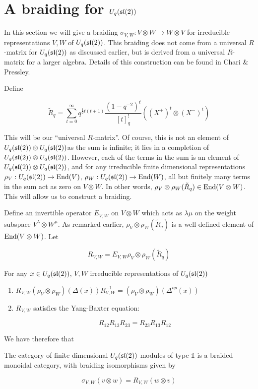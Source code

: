 \section{A braiding for $U_q(\mathfrak{sl}(2))$}


In this section we will give a braiding $\sigma_{V,W}: V \otimes W \to W
\otimes V$ for irreducible representations $V,W$ of $U_q(\mathfrak{sl}(2))$. This
braiding does not come from a universal $R$-matrix for $U_q(\mathfrak{sl}(2))$ as
discussed earlier, but is derived from a universal $R$-matrix for a larger
algebra. Details of this construction can be found in Chari \& Pressley.


Define 

\begin{equation}
\tilde{R}_q = \sum_{t=0}^\infty q^{\frac{1}{2} t(t+1)} \frac{(1-q^{-2})^t}{[t]_q^{!}} ((X^+)^t \otimes (X^-)^t)
\end{equation}

This will be our ``universal $R$-matrix''. Of course, this is not an element of
$U_q(\mathfrak{sl}(2)) \otimes U_q(\mathfrak{sl}(2))$as the sum is infinite; it lies in a
completion of $U_q(\mathfrak{sl}(2)) \otimes U_q(\mathfrak{sl}(2))$. However, each of the terms
in the sum is an element of $U_q(\mathfrak{sl}(2)) \otimes U_q(\mathfrak{sl}(2))$, and for any
irreducible finite dimensional representations $\rho_V : U_q(\mathfrak{sl}(2)) \to
\operatorname{End}(V)$, $\rho_W : U_q(\mathfrak{sl}(2)) \to \operatorname{End}(W)$, all but finitely many terms in the
sum act as zero on $V \otimes W$. In other words, $\rho_V \otimes \rho_W
(\tilde{R}_q) \in \operatorname{End}(V \otimes W)$. This will allow us to construct a
braiding.


Define an invertible operator $E_{V,W}$ on $V \otimes W$ which acts as
$\lambda\mu$ on the weight subspace $V^\lambda \otimes W^\mu$. As remarked
earlier, $\rho_V \otimes \rho_W (\tilde{R}_q) $ is a well-defined element of
$\operatorname{End}(V \otimes W)$. Let 

\begin{equation}
R_{V,W} = E_{V,W} \rho_V \otimes \rho_W (\tilde{R}_q)
\end{equation}

\begin{claim}
For any $x \in U_q(\mathfrak{sl}(2))$, $V,W$ irreducible representations of $U_q(\mathfrak{sl}(2))$
\begin{enumerate}
\item $R_{V,W} (\rho_V \otimes \rho_W) (\Delta(x)) R^{-1}_{V,W} = (\rho_{V} \otimes \rho_W)(\Delta^{op}(x))$
\item $R_{V,W}$  satisfies the Yang-Baxter equation: 

\begin{equation}
R_{12} R_{13} R_{23} = R_{23} R_{13} R_{12}
\end{equation}
\end{enumerate}
\end{claim}

We have therefore that 

\begin{theorem}
The category of finite dimensional $U_q(\mathfrak{sl}(2))$-modules of type $\mathbb{1}$ is a braided monoidal category, with braiding isomorphisms given by 

\begin{equation}
\sigma_{V,W}(v \otimes w) = R_{V,W}(w \otimes v)
\end{equation}
\end{theorem}



